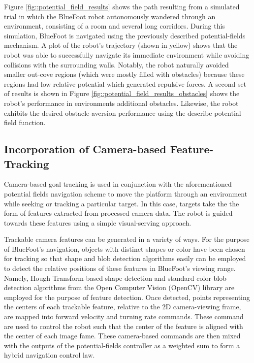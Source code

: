 			Figure \ref{fig::potential_field_results} shows the path resulting from a simulated trial in which the BlueFoot robot autonomously wandered through an environment, consisting of a room and several long corridors. During this simulation, BlueFoot is navigated using the previously described potential-fields mechanism. A plot of the robot's trajectory (shown in yellow) shows that the robot was able to successfully navigate its immediate environment while avoiding collisions with the surrounding walls. Notably, the robot naturally avoided smaller out-cove regions (which were mostly filled with obstacles) because these regions had low relative potential which generated repulsive forces. A second set of results is shown in Figure \ref{fig::potential_field_results_obstacles} shows the robot's performance in environments additional obstacles. Likewise, the robot exhibits the desired obstacle-aversion performance using the describe potential field function.


		\subsection{Incorporation of Camera-based Feature-Tracking}
		
			Camera-based goal tracking is used in conjunction with the aforementioned potential fields navigation scheme to move the platform through an environment while seeking or tracking a particular target. In this case, targets take the the form of features extracted from processed camera data. The robot is guided towards these features using a simple visual-serving approach. 

			Trackable camera features can be generated in a variety of ways. For the purpose of BlueFoot's navigation, objects with distinct shapes or color have been chosen for tracking so that shape and blob detection algorithms easily can be employed to detect the relative positions of these features in BlueFoot's viewing range. Namely, Hough Transform-based shape detection and standard color-blob detection algorithms from the Open Computer Vision (OpenCV) library are employed for the purpose of feature detection\cite{opencv_library}. Once detected, points representing the centers of each trackable feature, relative to the 2D camera-viewing frame, are mapped into forward velocity and turning rate commands. These command are used to control the robot such that the center of the feature is aligned with the center of each image fame. These camera-based commands are then mixed with the outputs of the potential-fields controller as a weighted sum to form a hybrid navigation control law.

